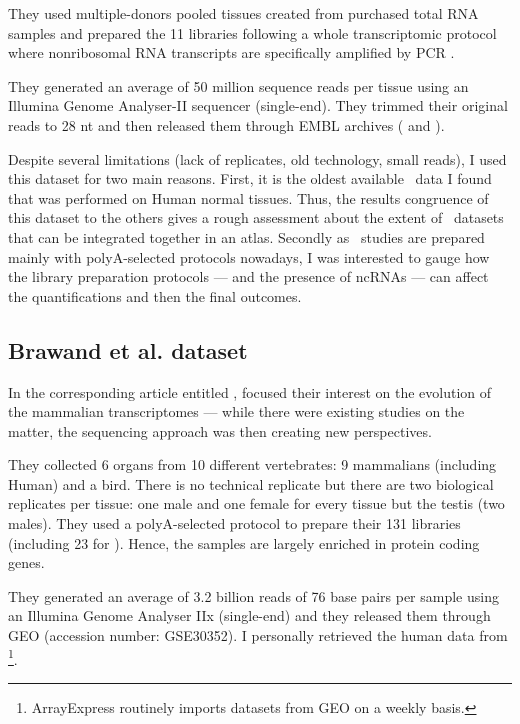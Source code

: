 They used multiple-donors pooled tissues created from purchased total \gls{RNA}
samples and prepared the 11 libraries following a whole transcriptomic protocol
where nonribosomal \gls{RNA} transcripts are
specifically amplified by \gls{PCR} .

They generated an average of 50 million sequence reads per tissue
using an Illumina Genome Analyser-II sequencer (single-end).
They trimmed their original reads to 28 \gls{nt}
and then released them through EMBL archives (
and ).

Despite several limitations (lack of replicates, old technology, small reads),
I used this dataset for two main reasons. First, it is the oldest available
\Rnaseq\ data I found that was performed on Human normal tissues. Thus, the
results congruence of this dataset to the others gives a rough assessment about
the extent of \Rnaseq\ datasets that can be integrated together in an atlas.
Secondly as \Rnaseq\ studies are prepared mainly with polyA-selected protocols
nowadays, I was interested to gauge how the library preparation
protocols --- and the presence of \glspl{ncRNA} --- can affect the
quantifications and then the final outcomes.


\subsection{Brawand et al. dataset}
\label{subsec:brawandpresentation}
In the corresponding article entitled ,
\citet{VTpaper} focused their interest on the
evolution of the mammalian transcriptomes --- while there were existing studies
on the matter, the sequencing approach was then creating new perspectives.

They collected 6 organs from 10 different vertebrates:
9 mammalians (including Human) and a bird. There is no technical replicate
but there are two biological replicates per tissue:
one male and one female for every tissue but the testis (two males).
They used a polyA-selected protocol to prepare their 131 libraries (including 23
for ).
Hence, the samples are largely enriched in protein coding genes.

They generated an average of 3.2 billion reads of 76 base pairs per sample
using an Illumina Genome Analyser IIx (single-end) and they released them
through \gls{GEO} (accession number: GSE30352).
I personally retrieved the human data from
\footnote{ArrayExpress routinely imports
datasets from \gls{GEO} on a weekly basis.}.


